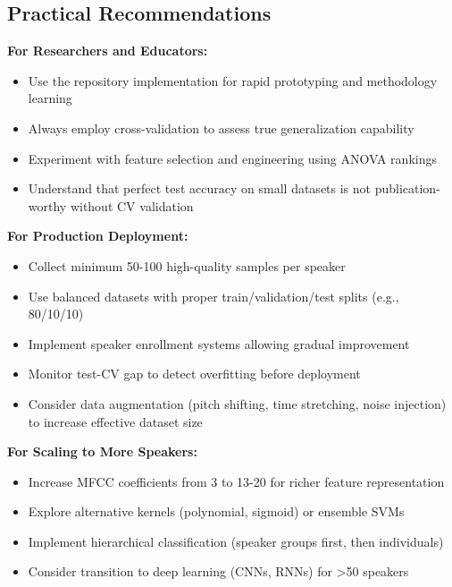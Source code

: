 \documentclass[11pt,twoside,openany]{book}
\begin{document}
\subsection{Practical Recommendations}

\textbf{For Researchers and Educators:}
\begin{itemize}[itemsep=1pt]
\item Use the repository implementation for rapid prototyping and methodology learning
\item Always employ cross-validation to assess true generalization capability
\item Experiment with feature selection and engineering using ANOVA rankings
\item Understand that perfect test accuracy on small datasets is not publication-worthy without CV validation
\end{itemize}

\textbf{For Production Deployment:}
\begin{itemize}[itemsep=1pt]
\item Collect minimum 50-100 high-quality samples per speaker
\item Use balanced datasets with proper train/validation/test splits (e.g., 80/10/10)
\item Implement speaker enrollment systems allowing gradual improvement
\item Monitor test-CV gap to detect overfitting before deployment
\item Consider data augmentation (pitch shifting, time stretching, noise injection) to increase effective dataset size
\end{itemize}

\textbf{For Scaling to More Speakers:}
\begin{itemize}[itemsep=1pt]
\item Increase MFCC coefficients from 3 to 13-20 for richer feature representation
\item Explore alternative kernels (polynomial, sigmoid) or ensemble SVMs
\item Implement hierarchical classification (speaker groups first, then individuals)
\item Consider transition to deep learning (CNNs, RNNs) for >50 speakers
\end{itemize}
\end{document}
